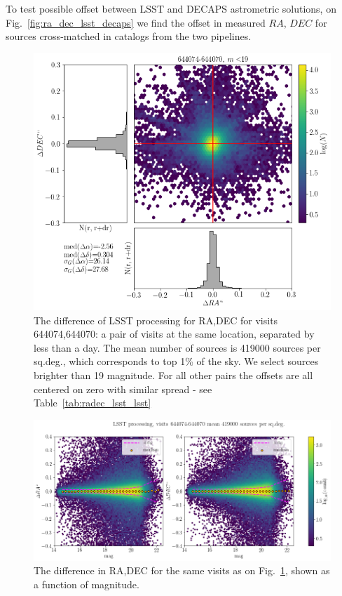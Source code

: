 \documentclass[DM,lsstdraft,toc,usenatbib]{lsstdoc}
\begin{document}
To test possible offset between LSST and DECAPS astrometric solutions, on Fig.~\ref{fig:ra_dec_lsst_decaps} we find the offset in measured $RA$, $DEC$ for sources cross-matched in catalogs from the two pipelines. 

\begin{figure}
\begin{centering}
\includegraphics[width=0.8\columnwidth]{figs/lsst644074-644070_RA_DEC_offset_lims.png}
\caption{The difference of LSST processing for  RA,DEC for visits 644074,644070: a pair of visits at the same location, separated by less than a day. The mean number of sources is 419000 sources per sq.deg., which corresponds to top 1\% of the sky.  We select sources brighter than 19 magnitude.  For all other pairs the  offsets are all centered on zero with similar spread - see Table~\ref{tab:radec_lsst_lsst}}
\label{fig:ra_dec_lsst_lsst}
\end{centering}
\end{figure} 


\begin{figure}
\begin{centering}
\includegraphics[width=1.0\columnwidth]{figs/644074-644070_dra_ddec_mag.png}
\caption{The difference in RA,DEC for the same visits as on Fig.~\ref{fig:ra_dec_lsst_lsst}, shown as a function of magnitude.}
\label{fig:ra_dec_mag}
\end{centering}
\end{figure} 
\end{document}
